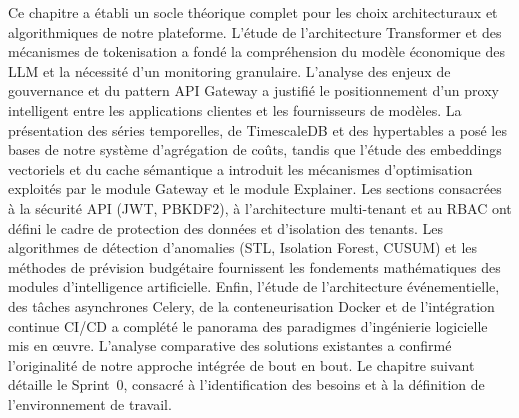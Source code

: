 Ce chapitre a établi un socle théorique complet pour les choix architecturaux et algorithmiques de notre plateforme. L'étude de l'architecture Transformer et des mécanismes de tokenisation a fondé la compréhension du modèle économique des LLM et la nécessité d'un monitoring granulaire. L'analyse des enjeux de gouvernance et du pattern API Gateway a justifié le positionnement d'un proxy intelligent entre les applications clientes et les fournisseurs de modèles. La présentation des séries temporelles, de TimescaleDB et des hypertables a posé les bases de notre système d'agrégation de coûts, tandis que l'étude des embeddings vectoriels et du cache sémantique a introduit les mécanismes d'optimisation exploités par le module Gateway et le module Explainer. Les sections consacrées à la sécurité API (JWT, PBKDF2), à l'architecture multi-tenant et au RBAC ont défini le cadre de protection des données et d'isolation des tenants. Les algorithmes de détection d'anomalies (STL, Isolation Forest, CUSUM) et les méthodes de prévision budgétaire fournissent les fondements mathématiques des modules d'intelligence artificielle. Enfin, l'étude de l'architecture événementielle, des tâches asynchrones Celery, de la conteneurisation Docker et de l'intégration continue CI/CD a complété le panorama des paradigmes d'ingénierie logicielle mis en \oe uvre. L'analyse comparative des solutions existantes a confirmé l'originalité de notre approche intégrée de bout en bout. Le chapitre suivant détaille le Sprint~0, consacré à l'identification des besoins et à la définition de l'environnement de travail.
